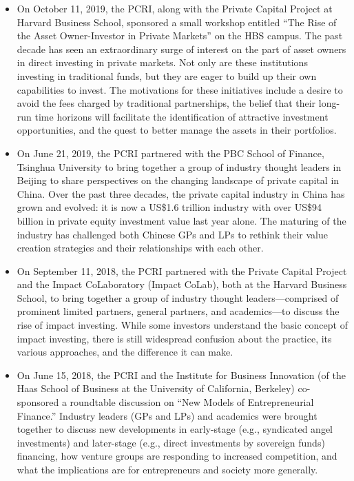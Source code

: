 \documentclass[
]{WileySix}
\begin{document}
\begin{itemize}
\item
  On October 11, 2019, the PCRI, along with the Private Capital Project at Harvard Business School, sponsored a small workshop entitled ``The Rise of the Asset Owner-Investor in Private Markets'' on the HBS campus. The past decade has seen an extraordinary surge of interest on the part of asset owners in direct investing in private markets. Not only are these institutions investing in traditional funds, but they are eager to build up their own capabilities to invest. The motivations for these initiatives include a desire to avoid the fees charged by traditional partnerships, the belief that their long-run time horizons will facilitate the identification of attractive investment opportunities, and the quest to better manage the assets in their portfolios.
\item
  On June 21, 2019, the PCRI partnered with the PBC School of Finance, Tsinghua University to bring together a group of industry thought leaders in Beijing to share perspectives on the changing landscape of private capital in China. Over the past three decades, the private capital industry in China has grown and evolved: it is now a US\$1.6 trillion industry with over US\$94 billion in private equity investment value last year alone. The maturing of the industry has challenged both Chinese GPs and LPs to rethink their value creation strategies and their relationships with each other.
\item
  On September 11, 2018, the PCRI partnered with the Private Capital Project and the Impact CoLaboratory (Impact CoLab), both at the Harvard Business School, to bring together a group of industry thought leaders---comprised of prominent limited partners, general partners, and academics---to discuss the rise of impact investing. While some investors understand the basic concept of impact investing, there is still widespread confusion about the practice, its various approaches, and the difference it can make.
\item
  On June 15, 2018, the PCRI and the Institute for Business Innovation (of the Haas School of Business at the University of California, Berkeley) co-sponsored a roundtable discussion on ``New Models of Entrepreneurial Finance.'' Industry leaders (GPs and LPs) and academics were brought together to discuss new developments in early-stage (e.g., syndicated angel investments) and later-stage (e.g., direct investments by sovereign funds) financing, how venture groups are responding to increased competition, and what the implications are for entrepreneurs and society more generally.
\end{itemize}
\end{document}
